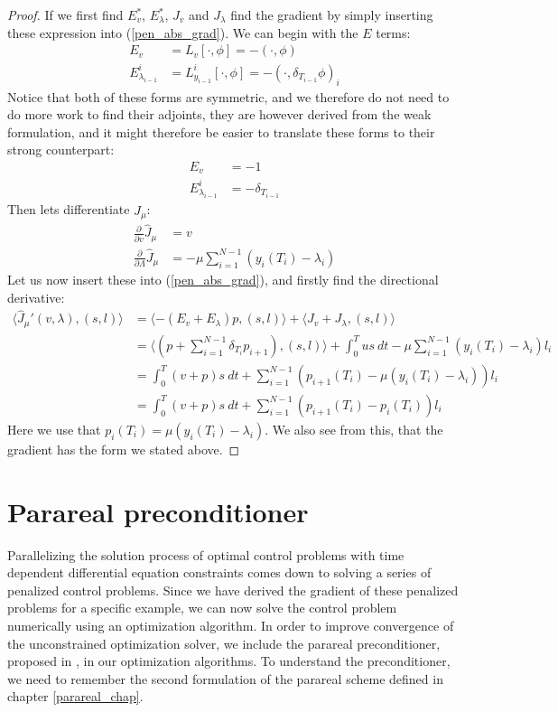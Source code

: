 \begin{proof}
If we first find $E_v^*$, $E_{\lambda}^*$, $J_v$ and $J_{\lambda}$ find the gradient by simply inserting these expression into (\ref{pen_abs_grad}). We can begin with the $E$ terms:
\begin{align*}
E_v &= L_v[\cdot,\phi] = -(\cdot,\phi) \\
E_{\lambda_{i-1}}^i &= L_{y_{i-1}}^i[\cdot,\phi] = -(\cdot,\delta_{T_{i-1}}\phi)_i
\end{align*}
Notice that both of these forms are symmetric, and we therefore do not need to do more work to find their adjoints, they are however derived from the weak formulation, and it might therefore be easier to translate these forms to their strong counterpart:
\begin{align*}
E_v &=-1 \\
E_{\lambda_{i-1}}^i &= -\delta_{T_{i-1}}
\end{align*}
Then lets differentiate $\hat J_{\mu}$:
\begin{align*}
\frac{\partial}{\partial v}\hat J_{\mu} &= v \\
\frac{\partial}{\partial \Lambda}\hat J_{\mu} &= - \mu \sum_{i=1}^{N-1}(y_{i}(T_i)-\lambda_i)
\end{align*}
Let us now insert these into (\ref{pen_abs_grad}), and firstly find the directional derivative:
\begin{align*}
\langle \hat J_{\mu}'(v,\lambda), (s,l)\rangle&=\langle -(E_v+E_{\lambda})p, (s,l)\rangle + \langle J_v+J_{\lambda}, (s,l)\rangle \\
&= \langle (p+\sum_{i=1}^{N-1} \delta_{T_i}p_{i+1}) , (s,l)\rangle+ \int_0^T us \ dt - \mu \sum_{i=1}^{N-1}(y_{i}(T_i)-\lambda_i)l_i\\
&=\int_0^T (v+p)s \ dt +\sum_{i=1}^{N-1}(p_{i+1}(T_i) -\mu(y_{i}(T_i)-\lambda_i) )l_i \\
&= \int_0^T (v+p)s \ dt +\sum_{i=1}^{N-1}(p_{i+1}(T_i) -p_{i}(T_i) )l_i
\end{align*} 
Here we use that $p_i(T_i) = \mu(y_{i}(T_i)-\lambda_i)$. We also see from this, that the gradient has the form we stated above.
\end{proof} 
\section{Parareal preconditioner} \label{pc sec}
Parallelizing the solution process of optimal control problems with time dependent differential equation constraints comes down to solving a series of penalized control problems. Since we have derived the gradient of these penalized problems for a specific example, we can now solve the control problem numerically using an optimization algorithm. In order to improve convergence of the unconstrained optimization solver, we include the parareal preconditioner, proposed in \cite{maday2002parareal}, in our optimization algorithms. To understand the preconditioner, we need to remember the second formulation of the parareal scheme defined in chapter \ref{parareal_chap}.
